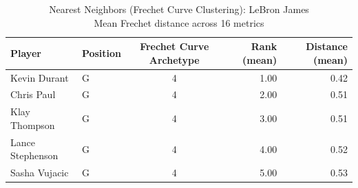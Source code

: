 \begin{table}[t]
\caption*{
{\fontsize{20}{25} Nearest Neighbors (Frechet Curve Clustering): LeBron James\fontsize{12}{15}\selectfont } \\ 
{\fontsize{14}{17}\selectfont  Mean Frechet distance across 16 metrics\fontsize{12}{15}\selectfont }
} 
\fontsize{12.0pt}{14.0pt}\selectfont
\begin{tabular*}{\linewidth}{@{\extracolsep{\fill}}llcrr}
\toprule
Player & Position & Frechet Curve Archetype & Rank (mean) & Distance (mean) \\ 
\midrule\addlinespace[2.5pt]
Kevin Durant & G & 4 & 1.00 & 0.42 \\ 
Chris Paul & G & 4 & 2.00 & 0.51 \\ 
Klay Thompson & G & 4 & 3.00 & 0.51 \\ 
Lance Stephenson & G & 4 & 4.00 & 0.52 \\ 
Sasha Vujacic & G & 4 & 5.00 & 0.53 \\ 
\bottomrule
\end{tabular*}
\end{table}

